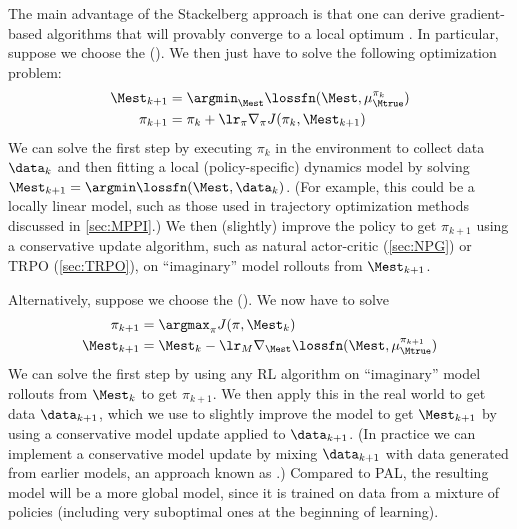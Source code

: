 The main advantage of the Stackelberg approach  is that one can derive
gradient-based algorithms that will provably converge to a local
optimum \citep{Colson2007,Zucchet2022}.
In particular, suppose we choose the 
().
We then just have to solve the following optimization problem:
\begin{align*}
  \Mest_{k+1} &= \argmin_{\Mest} \lossfn(\Mest, \mu_{\Mtrue}^{\pi_k}) \\
  \pi_{k+1} &= \pi_k + \lr_{\pi} \nabla_{\pi} J(\pi_k, \Mest_{k+1})
\end{align*}
We can solve the first step by executing
$\pi_k$ in the environment to collect data $\data_k$
and then fitting a local (policy-specific) dynamics model
by solving $\Mest_{k+1} = \argmin \lossfn(\Mest, \data_k)$.
(For example, this could be a locally linear model,
such as those used in trajectory optimization
methods discussed in \cref{sec:MPPI}.)
We then (slightly) improve the policy to get $\pi_{k+1}$ using a
conservative update algorithm, such as natural actor-critic (\cref{sec:NPG})
or TRPO (\cref{sec:TRPO}),
on ``imaginary'' model rollouts from $\Mest_{k+1}$.

Alternatively, suppose we choose the
 ().
We now have to solve
\begin{align*}
  \pi_{k+1} &= \argmax_{\pi} J(\pi, \Mest_k) \\
  \Mest_{k+1} &= \Mest_k - \lr_{M} \nabla_{\Mest}
  \lossfn(\Mest, \mu_{\Mtrue}^{\pi_{k+1}})
\end{align*}
We can solve the first step by using  any RL algorithm
on ``imaginary'' model rollouts from $\Mest_{k}$
to get $\pi_{k+1}$.
We then apply this in the real world to get data $\data_{k+1}$,
which we use to slightly improve the model to get $\Mest_{k+1}$
by using a conservative model update applied to $\data_{k+1}$.
(In practice we can implement a conservative model update
by mixing $\data_{k+1}$ with data generated from earlier
models, an approach known as 
\citep{Ross2012}.)
Compared to PAL, the resulting model will be a more  global model,
since it is trained on data from a mixture of policies
(including very suboptimal ones at the beginning of learning).



